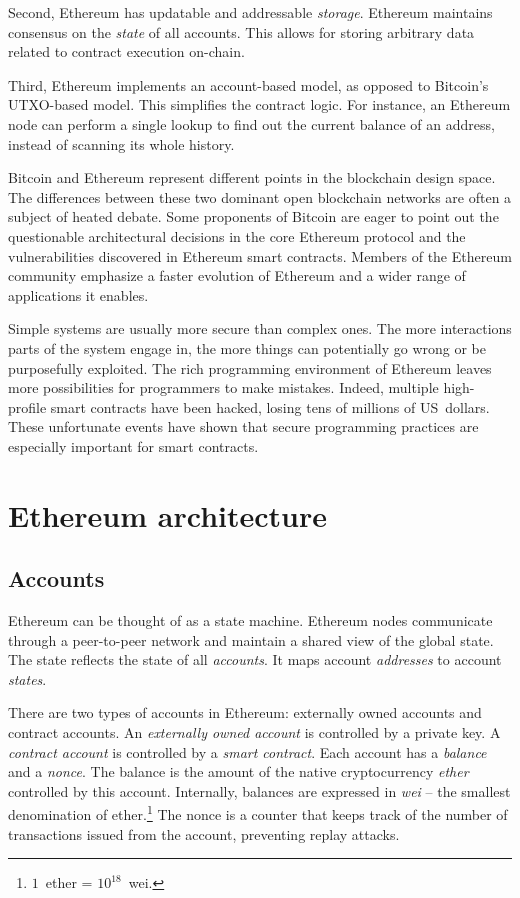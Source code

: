 Second, Ethereum has updatable and addressable \textit{storage}.
Ethereum maintains consensus on the \textit{state} of all accounts.
This allows for storing arbitrary data related to contract execution on-chain.

Third, Ethereum implements an account-based model, as opposed to Bitcoin's UTXO-based model.
This simplifies the contract logic.
For instance, an Ethereum node can perform a single lookup to find out the current balance of an address, instead of scanning its whole history.

Bitcoin and Ethereum represent different points in the blockchain design space.
The differences between these two dominant open blockchain networks are often a subject of heated debate.
Some proponents of Bitcoin are eager to point out the questionable architectural decisions in the core Ethereum protocol and the vulnerabilities discovered in Ethereum smart contracts.
Members of the Ethereum community emphasize a faster evolution of Ethereum and a wider range of applications it enables.

Simple systems are usually more secure than complex ones.
The more interactions parts of the system engage in, the more things can potentially go wrong or be purposefully exploited.
The rich programming environment of Ethereum leaves more possibilities for programmers to make mistakes.
Indeed, multiple high-profile smart contracts have been hacked, losing tens of millions of US~dollars.
These unfortunate events have shown that secure programming practices are especially important for smart contracts.


\section{Ethereum architecture}

\subsection{Accounts}

Ethereum can be thought of as a state machine.
Ethereum nodes communicate through a peer-to-peer network and maintain a shared view of the global state.
The state reflects the state of all \textit{accounts}.
It maps account \textit{addresses} to account \textit{states}.

There are two types of accounts in Ethereum: externally owned accounts and contract accounts.
An \textit{externally owned account} is controlled by a private key.
A \textit{contract account} is controlled by a \textit{smart contract}.
Each account has a \textit{balance} and a \textit{nonce}.
The balance is the amount of the native cryptocurrency \textit{ether} controlled by this account.
Internally, balances are expressed in \textit{wei} -- the smallest denomination of ether.\footnote{$1$~ether = $10^{18}$~wei.}
The nonce is a counter that keeps track of the number of transactions issued from the account, preventing replay attacks.

